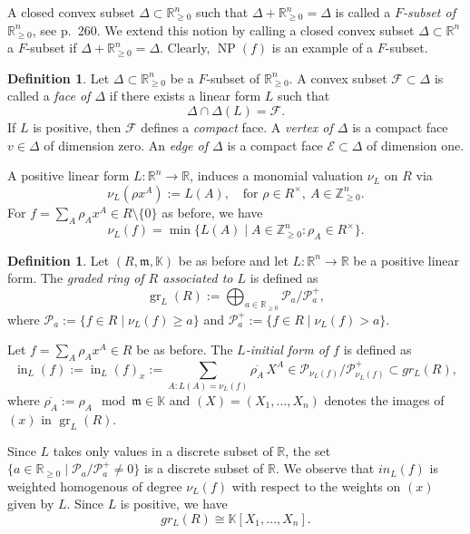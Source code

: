 \documentclass[11pt]{amsart}
\theoremstyle{plain}
\theoremstyle{definition}
\newtheorem{Def}[Thm]{Definition}
\numberwithin{equation}{section}
\newcommand{\gr}{\operatorname{gr}}
\newcommand{\ini}{\operatorname{in}}
\newcommand{\NP}{\operatorname{NP}}
\renewcommand{\r}{\rho}
\newcommand{\D}{\Delta}
\newcommand{\KK}{{\mathbb K}}
\newcommand{\RR}{\mathbb R}
\newcommand{\ZZ}{{\mathbb Z}}
\newcommand{\cE}{\mathcal{E}}
\newcommand{\cF}{\mathcal{F}}
\newcommand{\cP}{\mathcal P}
\newcommand{\Face}{\cF}
\newcommand{\Edge}{\cE}
\newcommand{\fm}{\mathfrak m}
\newcommand{\gqz}{{\geq 0}}
\newcommand{\ovl}{\overline}
\renewcommand{\(}{(\!(}
\renewcommand{\)}{)\!)}
\begin{document}
\smallskip

A closed convex subset $ \D \subset \RR^n_\gqz $ such that $ \D + \RR^n_\gqz = \D $ is called a {\em $ F $-subset of $ \RR^n_\gqz $},
see \cite{HiroCharPoly} p.~260.
We extend this notion by calling a closed convex subset $ \D \subset \RR^n $ a $ F $-subset if $ \D + \RR^n_\gqz = \D $.
Clearly, $ \NP( f )$ is an example of a $ F $-subset.

\begin{Def}
	Let $ \D \subset \RR^n_\gqz $ be a $ F $-subset of $ \RR^n_ \gqz $.
		A convex subset $ \Face \subset \D $ is called a {\em face of $ \D $} if there exists a linear form $ L $ such that 
		\[
			\D \cap \D(L) = \Face.
		\]
		If $ L $ is positive, then $ \Face $ defines a {\em compact} face.
		A {\em vertex of $ \D $} is a compact face $ v \in \D $ of dimension zero.
		An {\em edge of $ \D $} is a compact face $ \Edge \subset \D $ of dimension one.
\end{Def} 

A positive linear form $ L : \RR^n \to \RR $,
induces a monomial valuation $ \nu_L $ on $ R $ via
\[ 
	\nu_L (\r x^A) := L(A),
	\ \ \ 
	\mbox{ for } \r \in R^\times, \ A \in \ZZ^n_\gqz.
\]
For $ f = \sum_A \r_A x^A \in R \setminus \{ 0 \} $ as before, 
we have 
\[ 
	\nu_L(f) = \min \{ L(A) \mid A \in \ZZ^n_\gqz  : \r_A \in R^\times \}.
\]
  
\begin{Def}
	Let $ (R, \fm, \KK) $ be as before and let $ L : \RR^n \to \RR $ be a positive linear form.
	The {\em graded ring of $ R $ associated to $ L $} is defined as
		\[
			\gr_L(R) := \bigoplus_{ a \in \RR_\gqz }
			\cP_a / \cP_a^+, 
		\]
		where $ \cP_a := \{ f \in R \mid \nu_L (f) \geq a \} $ and 
		$ \cP_a^+ := \{ f \in R \mid \nu_L (f) > a \} $.
		
		Let $ f = \sum_A \r_A x^A \in R $ be as before.
		The {\em $ L $-initial form of $ f $} is defined as
		\[
			\ini_L(f) := \ini_L(f)_x
			:= \sum_{A : L(A) =  \nu_L(f) } \ovl{\r_A} \, X^A
			\in \cP_{ \nu_L(f)}/ \cP_{ \nu_L(f)}^+ \subset gr_L(R),
		\]
		where $ \ovl{\r_A} := \r_A \mod \fm  \in \KK $ 
		and $ (X) = (X_1, \ldots, X_n) $ denotes the images of $ (x) $ in $ \gr_L(R) $.
\end{Def}

Since $ L $ takes only values in a discrete subset of $  \RR $, 
the set $ \{ a \in \RR_\gqz \mid \cP_a / \cP_a^+ \neq 0 \} $ is a discrete subset of $ \RR $.
We observe that $ in_L(f) $ is weighted homogenous of degree $ \nu_L(f) $ with respect to the weights on $ (x) $ given by $ L $.
Since $ L $ is positive, we have 
\[
	gr_L(R) \cong \KK [X_1, \ldots, X_n].
\]
	
\end{document}
